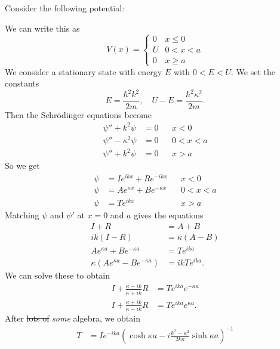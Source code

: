 \documentclass[a4paper]{article}
\begin{document}
Consider the following potential:
\begin{center}
\end{center}
We can write this as
\[
  V(x) =
  \begin{cases}
    0 & x \leq 0\\
    U & 0 < x < a\\
    0 & x \geq a
  \end{cases}
\]
We consider a stationary state with energy $E$ with $0 < E < U$. We set the constants
\[
  E = \frac{\hbar^2 k^2}{2m},\quad U - E = \frac{\hbar^2\kappa^2}{2m}.
\]
Then the Schr\"odinger equations become
\begin{align*}
  \psi'' + k^2 \psi &= 0 && x < 0\\
  \psi'' - \kappa^2 \psi &= 0 && 0 < x < a\\
  \psi'' + k^2 \psi &= 0 && x > a
\end{align*}
So we get
\begin{align*}
  \psi &= I e^{ikx} + Re^{-ikx}&& x < 0\\
  \psi &= Ae^{\kappa x} + Be^{-\kappa x}&& 0 < x < a\\
  \psi &= Te^{ikx} && x > a
\end{align*}
Matching $\psi$ and $\psi'$ at $x = 0$ and $a$ gives the equations
\begin{align*}
  I + R &= A + B\\
  ik(I - R) &= \kappa (A - B)\\
  A e^{\kappa a} + Be^{-\kappa a} &= Te^{ika}\\
  \kappa(Ae^{\kappa a} - Be^{-\kappa a}) &= ik Te^{ika}.
\end{align*}
We can solve these to obtain
\begin{align*}
  I + \frac{\kappa - ik}{\kappa + ik}R &= Te^{ika} e^{-\kappa a}\\
  I + \frac{\kappa + ik}{\kappa - ik}R &= Te^{ika} e^{\kappa a}.
\end{align*}
After \st{lots of} \emph{some} algebra, we obtain
\begin{align*}
  T &= I e^{-ika}\left(\cosh \kappa a - i\frac{k^2 - \kappa^2}{2k\kappa} \sinh \kappa a\right)^{-1}
\end{align*}
\end{document}
